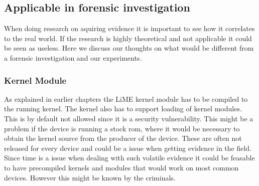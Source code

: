 \subsection{Applicable in forensic investigation}
When doing research on aquiring evidence it is important to see how it correlates 
to the real world. If the research is highly theoretical and not applicable it 
could be seen as useless. Here we discuss our thoughts on what would be different 
from a forensic investigation and our experiments.

\subsubsection{Kernel Module}
As explained in earlier chapters the LiME kernel module has to be compiled to the 
running kernel. The kernel also has to support loading of kernel modules. This is 
by default not allowed since it is a security vulnerability. This might be a 
problem if the device is running a stock rom, where it would be necessary to obtain 
the kernel source from the producer of the device. These are often not released for 
every device and could be a issue when getting evidence in the field. Since time is 
a issue when dealing with such volatile evidence it could be feasable to have 
precompiled kernels and modules that would work on most common devices. However 
this might be known by the criminals. %
